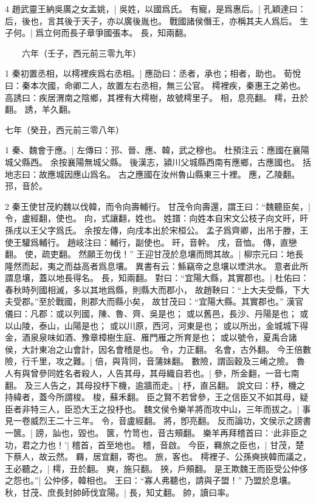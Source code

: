 4 趙武靈王納吳廣之女孟姚，|{
	吳姓，以國爲氏。
}
有寵，是爲惠后。|{
	孔穎達曰：后，後也，言其後于天子，亦以廣後胤也。
	戰國諸侯僭王，亦稱其夫人爲后。
}
生子何。|{
	爲立何而長子章爭國張本。
	長，知兩翻。
}

　　六年（壬子，西元前三零九年）

1 秦初置丞相，以樗裡疾爲右丞相。|{
	應劭曰：丞者，承也；相者，助也。
	荀悅曰：秦本次國，命卿二人，故置左右丞相，無三公官。
	樗裡疾，秦惠王之弟也。
	高誘曰：疾居渭南之陰鄉，其裡有大樗樹，故號樗里子。
	相，息亮翻。
	樗，丑於翻。
	誘，羊久翻。
}

七年（癸丑，西元前三零八年）

1 秦、魏會于應。|{
	左傳曰：邘、晉、應、韓，武之穆也。
	杜預注云：應國在襄陽城父縣西。
	余按襄陽無城父縣。
	後漢志，潁川父城縣西南有應鄉，古應國也。
	括地志曰：故應城因應山爲名。
	古之應國在汝州魯山縣東三十裡。
	應，乙陵翻。
	邘，音於。
}

2 秦王使甘茂約魏以伐韓，而令向壽輔行。
甘茂令向壽還，謂王曰：“魏聽臣矣，|{
	令，盧經翻，使也。
	向，式讓翻，姓也。
	姓譜：向姓本自宋文公枝子向文旰，旰孫戌以王父字爲氏。
	余按左傳，向戌本出於宋桓公。
	孟子爲齊卿，出吊于滕，王使王驩爲輔行。
	趙岐注曰：輔行，副使也。
	旰，音幹。
	戌，音恤。
	傳，直戀翻。
	使，疏吏翻。
}
然願王勿伐！”
王迎甘茂於息壤而問其故。|{
	柳宗元曰：地長隆然而起，夷之而益高者爲息壤。
	異書有云：鯀竊帝之息壤以堙洪水。
	意者此所謂息壤，蓋以地長得名。
	長，知兩翻。
}
對曰：“宜陽大縣，其實郡也。|{
	杜佑曰：春秋時列國相滅，多以其地爲縣，則縣大而郡小，
	故趙鞅曰：“上大夫受縣，下大夫受郡。”至於戰國，則郡大而縣小矣，
	故甘茂曰：“宜陽大縣。其實郡也。”
	漢官儀曰：凡郡：或以列國，陳、魯、齊、吳是也；
	或以舊邑，長沙、丹陽是也；
	或以山陵，泰山，山陽是也；
	或以川原，西河，河東是也；
	或以所出，金城城下得金，酒泉泉味如酒、豫章樟樹生庭、雁門雁之所育是也；
	或以號令，夏禹合諸侯，大計東冶之山會計，因名會稽是也。
	令，力正翻。
	名會，古外翻。
}
今王倍數險，行千里，攻之難。|{
	倍，與背同，音蒲妹翻。
	數險，謂函穀及三崤之險。
}
魯人有與曾參同姓名者殺人，人告其母，其母織自若也。|{
	參，所金翻，一音七南翻。
}
及三人告之，其母投杼下機，逾牆而走。|{
	杼，直呂翻。
	說文曰：杼，機之持緯者，蓋今所謂梭。
	梭，蘇禾翻。
}
臣之賢不若曾參，王之信臣又不如其母，疑臣者非特三人，臣恐大王之投杼也。
魏文侯令樂羊將而攻中山，三年而拔之。|{
	事見一卷威烈王二十三年。
	令，音盧經翻。
	將，卽亮翻。
}
反而論功，文侯示之謗書一篋。|{
	謗，訕也，毀也。
	篋，竹笥也，音古頰翻。
}
樂羊再拜稽首曰：‘此非臣之功，君之力也！’|{
	稽首，首至地也。
	稽，音啟。
}
今臣，羇旅之臣也，|{
	甘茂，楚下蔡人，故云然。
	羇，居宜翻，寄也。
	旅，客也。
}
樗裡子、公孫奭挾韓而議之，王必聽之，|{
	樗，丑於翻。
	奭，施只翻。
	挾，戶頰翻。
}
是王欺魏王而臣受公仲侈之怨也。”|{
	公仲侈，韓相也。
}
王曰：“寡人弗聽也，請與子盟！”
乃盟於息壤。
	秋，甘茂、庶長封帥師伐宜陽。|{
	長，知丈翻。
	帥，讀曰率。
}

